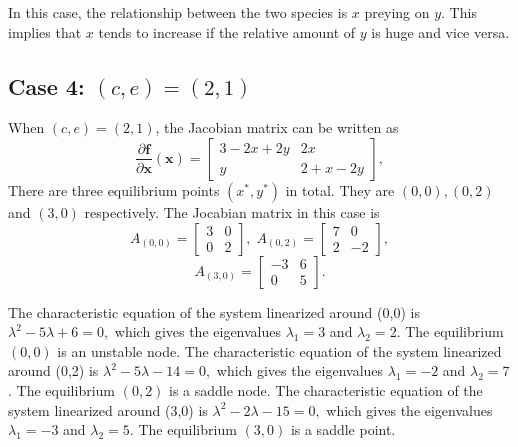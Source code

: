 \documentclass[a4paper,twocolumn]{article} %
\begin{document}
In this case, the relationship between the two species is $x$ preying on $y$. This implies that $x$ tends to increase if the relative amount of $y$ is huge and vice versa.   

\subsection*{Case 4: $(c,e)=(2,1)$}
When $(c,e)=(2,1)$, the Jacobian matrix can be written as
\begin{equation*}
    \frac{\partial\textbf{f}}{\partial \textbf{x}}(\textbf{x}) =
    \left[\begin{array}{cc}
    3-2x+2y & 2x \\
    y & 2+x-2y
    \end{array}\right],
\end{equation*}
There are three equilibrium points $(x^*,y^*)$ in total. They are $(0,0),(0,2)$ and $(3,0)$ respectively. The Jocabian matrix in this case is
\begin{equation*}
    A_{(0,0)} =
    \left[\begin{array}{cc}
    3 & 0 \\
    0 & 2
    \end{array}\right], \; A_{(0,2)} =
    \left[\begin{array}{cc}
    7 & 0 \\
    2 & -2
    \end{array}\right],   
    \end{equation*}
    \begin{equation*}
    A_{(3,0)} =
    \left[\begin{array}{cc}
    -3 & 6 \\
    0 & 5
    \end{array}\right].
\end{equation*}

The characteristic equation of the system linearized around \mbox{(0,0)} is
$\lambda^2 -5 \lambda + 6 = 0,$ which gives the eigenvalues $\lambda_{1} = 3$ and $\lambda_{2} = 2$. The equilibrium $(0,0)$ is an unstable node. 
The characteristic equation of the system linearized around \mbox{(0,2)} is
$\lambda^2 -5 \lambda - 14 = 0,$ which gives the eigenvalues $\lambda_1 = -2$ and $\lambda_2 = 7$. The equilibrium $(0,2)$ is a saddle node. 
The characteristic equation of the system linearized around \mbox{(3,0)} is
$\lambda^2 -2 \lambda - 15 = 0,$ which gives the eigenvalues $\lambda_1 = -3$ and $\lambda_2 = 5$. The equilibrium $(3,0)$ is a saddle point.
\end{document}

